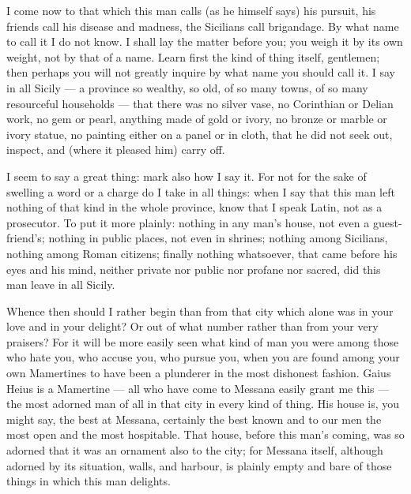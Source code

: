%

 I come now to that which this man calls (as he himself says) his pursuit, his friends call his disease and madness, the Sicilians call brigandage. By what name to call it I do not know. I shall lay the matter before you; you weigh it by its own weight, not by that of a name. Learn first the kind of thing itself, gentlemen; then perhaps you will not greatly inquire by what name you should call it. I say in all Sicily --- a province so wealthy, so old, of so many towns, of so many resourceful households --- that there was no silver vase, no Corinthian or Delian work, no gem or pearl, anything made of gold or ivory, no bronze or marble or ivory statue, no painting either on a panel or in cloth, that he did not seek out, inspect, and (where it pleased him) carry off.

 I seem to say a great thing: mark also how I say it. For not for the sake of swelling a word or a charge do I take in all things: when I say that this man left nothing of that kind in the whole province, know that I speak Latin, not as a prosecutor. To put it more plainly: nothing in any man's house, not even a guest-friend's; nothing in public places, not even in shrines; nothing among Sicilians, nothing among Roman citizens; finally nothing whatsoever, that came before his eyes and his mind, neither private nor public nor profane nor sacred, did this man leave in all Sicily.

 Whence then should I rather begin than from that city which alone was in your love and in your delight? Or out of what number rather than from your very praisers? For it will be more easily seen what kind of man you were among those who hate you, who accuse you, who pursue you, when you are found among your own Mamertines to have been a plunderer in the most dishonest fashion. Gaius Heius is a Mamertine --- all who have come to Messana easily grant me this --- the most adorned man of all in that city in every kind of thing. His house is, you might say, the best at Messana, certainly the best known and to our men the most open and the most hospitable. That house, before this man's coming, was so adorned that it was an ornament also to the city; for Messana itself, although adorned by its situation, walls, and harbour, is plainly empty and bare of those things in which this man delights.

